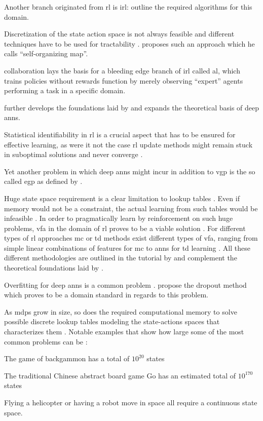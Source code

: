 \documentclass[draft=false]{seal_thesis}
\begin{document}
Another branch originated from \gls{rl} is \gls{irl}: \citet{Ng2000} outline the required algorithms for this domain.

Discretization of the state action space is not always feasible and different techniques have to be used for tractability \citep{Smith2002}. \citet{Smith2002} proposes such an approach which he calls ``self-organizing map''.

\citet{Abbeel2004} collaboration lays the basis for a bleeding edge branch of \gls{irl} called \gls{al}, which trains policies without rewards function by merely observing ``expert'' agents performing a task in a specific domain.

\citet{Bengio2009} further develops the foundations laid by \citet{Lecun1998} and expands the theoretical basis of deep \glspl{ann}.

Statistical identifiability in \gls{rl} is a crucial aspect that has to be ensured for effective learning, as were it not the case \gls{rl} update methods might remain stuck in suboptimal solutions and never converge \citep{Zhang2011}.

Yet another problem in which deep \glspl{ann} might incur in addition to \gls{vgp} is the so called \gls{egp} as defined by \citet{Pascanu2012}.

Huge state space requirement is a clear limitation to lookup tables \citep{Sutton2017}. Even if memory would not be a constraint, the actual learning from such tables would be infeasible \citep{Sutton2017}. In order to pragmatically learn by reinforcement on such huge problems, \gls{vfa} in the domain of \gls{rl} proves to be a viable solution \citep{Sutton2017}. For different types of \gls{rl} approaches \ie \gls{mc} or \gls{td} methods exist different types of \gls{vfa}, ranging from simple linear combinations of features for \gls{mc} to \glspl{ann} for \gls{td} learning \citep{Sutton2017}. All these different methodologies are outlined in the tutorial by \citet{Geramifard2013} and complement the theoretical foundations laid by \citet{Sutton2017}.

Overfitting for deep \glspl{ann} is a common problem \citep[p. 218]{Sutton2017}. \citet{Srivastava2014} propose the dropout method which proves to be a domain standard in regards to this problem.

As \glspl{mdp} grow in size, so does the required computational memory to solve possible discrete lookup tables modeling the state-actions spaces that characterizes them \citep{Sutton2017}. Notable examples that show how large some of the most common problems can be \citep{Sutton2017}:
\begin{enumerate*}
	\item The game of backgammon has a total of $10^{20}$ states
	\item The traditional Chinese abstract board game Go has an estimated total of $10^{170}$ states
	\item Flying a helicopter or having a robot move in space all require a continuous state space.
\end{enumerate*}
\end{document}
